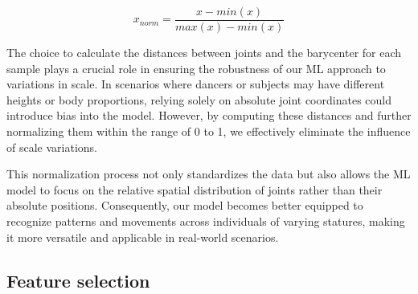 \begin{equation}
    x_{norm} = \frac{{x - min(x)}}{{max(x) - min(x)}}
    \label{formula:normalization}
\end{equation}
    
The choice to calculate the distances between joints and the barycenter for each sample plays a crucial role in ensuring the robustness of our ML approach to variations in scale.
In scenarios where dancers or subjects may have different heights or body proportions, relying solely on absolute joint coordinates could introduce bias into the model.
However, by computing these distances and further normalizing them within the range of 0 to 1, we effectively eliminate the influence of scale variations.

This normalization process not only standardizes the data but also allows the ML model to focus on the relative spatial distribution of joints rather than their absolute positions.
Consequently, our model becomes better equipped to recognize patterns and movements across individuals of varying statures, making it more versatile and applicable in real-world scenarios.

\subsection{Feature selection}

